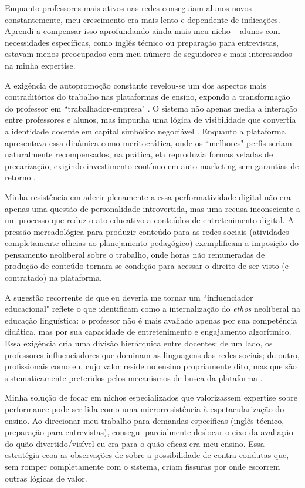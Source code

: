 \documentclass[portuguese]{textolivre}
\begin{document}
Enquanto professores mais ativos nas redes conseguiam alunos novos constantemente, meu crescimento era mais lento e dependente de indicações. Aprendi a compensar isso aprofundando ainda mais meu nicho -- alunos com necessidades específicas, como inglês técnico ou preparação para entrevistas, estavam menos preocupados com meu número de seguidores e mais interessados na minha expertise.

A exigência de autopromoção constante revelou-se um dos aspectos mais contraditórios do trabalho nas plataformas de ensino, expondo a transformação do professor em ``trabalhador-empresa" \cite{abilio2020}. O sistema não apenas media a interação entre professores e alunos, mas impunha uma lógica de visibilidade que convertia a identidade docente em capital simbólico negociável \cite{block-gray2012}. Enquanto a plataforma apresentava essa dinâmica como meritocrática, onde os ``melhores" perfis seriam naturalmente recompensados, na prática, ela reproduzia formas veladas de precarização, exigindo investimento contínuo em auto marketing sem garantias de retorno \cite{standing2014}.

Minha resistência em aderir plenamente a essa performatividade digital não era apenas uma questão de personalidade introvertida, mas uma recusa inconsciente a um processo que reduz o ato educativo a conteúdos de entretenimento digital. A pressão mercadológica para produzir conteúdo para as redes sociais (atividades completamente alheias ao planejamento pedagógico) exemplificam a imposição do pensamento neoliberal sobre o trabalho, onde horas não remuneradas de produção de conteúdo tornam-se condição para acessar o direito de ser visto (e contratado) na plataforma.

A sugestão recorrente de que eu deveria me tornar um ``influenciador educacional" reflete o que \textcite{block-gray2012} identificam como a internalização do \textit{ethos} neoliberal na educação linguística: o professor não é mais avaliado apenas por sua competência didática, mas por sua capacidade de entretenimento e engajamento algorítmico. Essa exigência cria uma divisão hierárquica entre docentes: de um lado, os professores-influenciadores que dominam as linguagens das redes sociais; de outro, profissionais como eu, cujo valor reside no ensino propriamente dito, mas que são sistematicamente preteridos pelos mecanismos de busca da plataforma \cite{cavazzani2024}.

Minha solução de focar em nichos especializados que valorizassem expertise sobre performance pode ser lida como uma microrresistência à espetacularização do ensino. Ao direcionar meu trabalho para demandas específicas (inglês técnico, preparação para entrevistas), consegui parcialmente deslocar o eixo da avaliação do quão divertido/visível eu era para o quão eficaz era meu ensino. Essa estratégia ecoa as observações de \textcite{mignolo2005} sobre a possibilidade de contra-condutas que, sem romper completamente com o sistema, criam fissuras por onde escorrem outras lógicas de valor.
\end{document}
